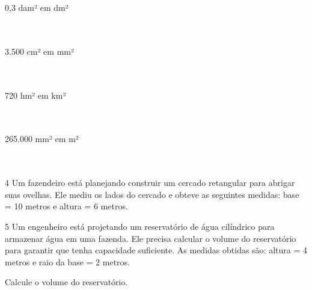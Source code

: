 \begin{escolha}

\item 0,3 dam² em dm² \\
 \\ \\

\item 3.500 cm² em mm² \\
 \\ \\

\item 720 hm² em km² \\
 \\ \\

\item 265.000 mm² em m² \\
 \\ \\

\end{escolha}


\num{4} Um fazendeiro está planejando construir um cercado retangular para
abrigar suas ovelhas. Ele mediu os lados do cercado e obteve as
seguintes medidas: base = 10 metros e altura = 6 metros.


\num{5} Um engenheiro está projetando um reservatório de água cilíndrico para
armazenar água em uma fazenda. Ele precisa calcular o volume do
reservatório para garantir que tenha capacidade suficiente. As medidas
obtidas são: altura = 4 metros e raio da base = 2 metros.

Calcule o volume do reservatório.


